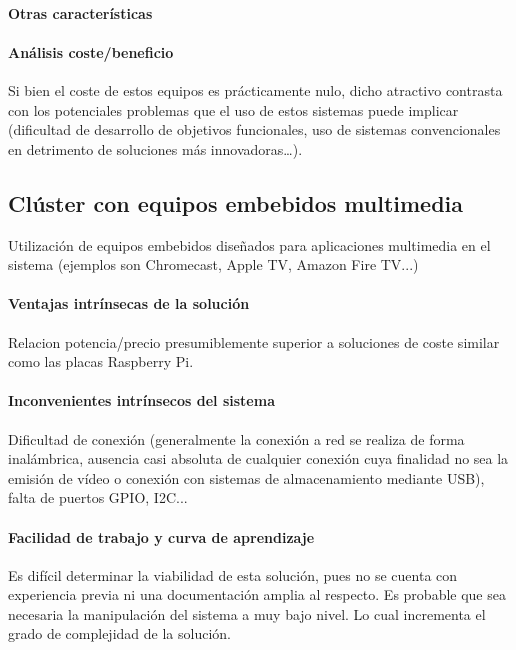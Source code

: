 \paragraph{Otras características}

\paragraph{Análisis coste/beneficio}

Si bien el coste de estos equipos es prácticamente nulo, dicho atractivo contrasta con los potenciales problemas que el uso de estos sistemas puede implicar (dificultad de desarrollo de objetivos funcionales, uso de sistemas convencionales en detrimento de soluciones más innovadoras\dots).

\subsection{Clúster con equipos embebidos multimedia }

Utilización de equipos embebidos diseñados para aplicaciones multimedia en el sistema (ejemplos son Chromecast, Apple TV, Amazon Fire TV...)

\paragraph{Ventajas intrínsecas de la solución}

Relacion potencia/precio presumiblemente superior a soluciones de coste similar como las placas Raspberry Pi.

\paragraph{Inconvenientes intrínsecos del sistema}

Dificultad de conexión (generalmente la conexión a red se realiza de forma inalámbrica, ausencia casi absoluta de cualquier conexión cuya finalidad no sea la emisión de vídeo o conexión con sistemas de almacenamiento mediante USB), falta de puertos GPIO, I2C...

\paragraph{Facilidad de trabajo y curva de aprendizaje}
Es difícil determinar la viabilidad de esta solución, pues no se cuenta con experiencia previa ni una documentación amplia al respecto.
Es probable que sea necesaria la manipulación del sistema a muy bajo nivel. Lo cual incrementa el grado de complejidad de la solución.

